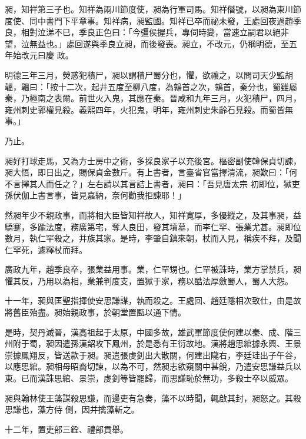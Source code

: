 \begin{pinyinscope}
 昶，知祥第三子也。知祥為兩川節度使，昶為行軍司馬。知祥僭號，以昶為東川節度使、同中書門下平章事。知祥病，昶監國。知祥已卒而祕未發，王處回夜過趙季良，相對泣涕不已，季良正色曰：「今彊侯握兵，專伺時變，當速立嗣君以絕非望，泣無益也。」處回遂與季良立昶，而後發喪。昶立，不改元，仍稱明德，至五年始改元曰慶
 政。



 明德三年三月，熒惑犯積尸，昶以謂積尸蜀分也，懼，欲禳之，以問司天少監胡韞，韞曰：「按十二次，起井五度至柳八度，為鶉首之次，鶉首，秦分也，蜀雖屬秦，乃極南之表爾。前世火入鬼，其應在秦。晉咸和九年三月，火犯積尸，四月，雍州刺史郭權見殺。義熙四年，火犯鬼，明年，雍州刺史朱齡石見殺。而蜀皆無事。」



 乃止。



 昶好打球走馬，又為方士房中之術，多採良家子以充後宮。樞密副使韓保貞切諫，昶大悟，即日出之，賜保貞金數斤。有上書者，言臺省官當擇清流，昶歎曰：「何不言擇其人而任之？」左右請以其言詰上書者，昶曰：「吾見唐太宗
 初即位，獄吏孫伏伽上書言事，皆見嘉納，奈何勸我拒諫耶！」



 然昶年少不親政事，而將相大臣皆知祥故人，知祥寬厚，多優縱之，及其事昶，益驕蹇，多踰法度，務廣第宅，奪人良田，發其墳墓，而李仁罕、張業尤甚。昶即位數月，執仁罕殺之，并族其家。是時，李肇自鎮來朝，杖而入見，稱疾不拜，及聞仁罕死，遽釋杖而拜。



 廣政九年，趙季良卒，張業益用事。業，仁罕甥也。仁罕被誅時，業方掌禁兵，昶懼其反，乃用以為相，業兼判度支，置獄于家，務以酷法厚斂蜀人，蜀人大怨。



 十一年，昶與匡聖指揮使安思謙謀，執而殺之。王處回、趙廷隱相次致仕，由是故
 將舊臣殆盡。昶始親政事，於朝堂置匭以通下情。



 是時，契丹滅晉，漢高祖起于太原，中國多故，雄武軍節度使何建以秦、成、階三州附于蜀，昶因遣孫漢韶攻下鳳州，於是悉有王衍故地。漢將趙思綰據永興、王景崇據鳳翔反，皆送款于昶。昶遣張虔釗出大散關，何建出隴右，李廷珪出子午谷，以應思綰。昶相母昭裔切諫，以為不可，然昶志欲窺關中甚銳，乃遣安思謙益兵以東。已而漢誅思綰、景崇，虔釗等皆罷歸，而思謙恥於無功，多殺士卒以威眾。



 昶與翰林使王藻謀殺思謙，而邊吏有急奏，藻不以時聞，輒啟其封，昶怒之。其殺思謙也，藻方侍
 側，因并擒藻斬之。



 十二年，置吏部三銓、禮部貢舉。




\end{pinyinscope}
